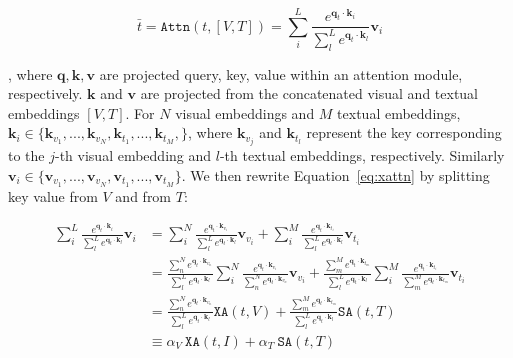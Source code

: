 
\begin{equation}
\bar{t} = \texttt{Attn}(t, [V, T]) = \sum_{i}^{L} \frac{e^{\bm{q}_t\cdot \bm{k}_{i}}}{\sum_{l}^{L} e^{\bm{q}_{t}\cdot \bm{k}_{l}}}\bm{v}_{i} \label{eq:xattn}
\end{equation}

, where $\bm{q}, \bm{k}, \bm{v}$ are projected query, key, value within an attention module, respectively.
$\bm{k}$ and $\bm{v}$ are projected from the concatenated visual and textual embeddings $[V, T]$.
For $N$ visual embeddings and $M$ textual embeddings, $\bm{k}_i \in \{\bm{k}_{v_1},...,\bm{k}_{v_N},\bm{k}_{t_1},...,\bm{k}_{t_M},\}$, where $\bm{k}_{v_j}$ and $\bm{k}_{t_l}$ represent the key corresponding to the $j$-th visual embedding and $l$-th textual embeddings, respectively. 
Similarly $\bm{v}_i \in \{\bm{v}_{v_1},...,\bm{v}_{v_N},\bm{v}_{t_1},...,\bm{v}_{t_M}\}$.
We then rewrite Equation~\ref{eq:xattn} by splitting key value from $V$ and from $T$:

\begin{align}
\sum_{i}^{L} \frac{e^{\bm{q}_t\cdot \bm{k}_{i}}}{\sum_{l}^{L} e^{\bm{q}_{t}\cdot \bm{k}_{l}}}\bm{v}_{i}
&= \sum_{i}^{N} \frac{e^{\bm{q}_t\cdot \bm{k}_{v_i}}}{\sum_{l}^{L} e^{\bm{q}_{t}\cdot \bm{k}_{l}}}\bm{v}_{v_i} +
\sum_{i}^{M} \frac{e^{\bm{q}_t\cdot \bm{k}_{t_i}}}{\sum_{l}^{L} e^{\bm{q}_{t}\cdot \bm{k}_{l}}}\bm{v}_{t_i}\\
&= \frac{\sum_{n}^{N} e^{\bm{q}_{t}\cdot \bm{k}_{v_n}}}{\sum_{l}^{L} e^{\bm{q}_{t}\cdot \bm{k}_{l}}} \sum_{i}^{N} \frac{e^{\bm{q}_t\cdot \bm{k}_{v_i}}}{\sum_{n}^{N} e^{\bm{q}_{t}\cdot \bm{k}_{v_n}}}\bm{v}_{v_i} +
\frac{\sum_{m}^{M} e^{\bm{q}_{t}\cdot \bm{k}_{t_m}}}{\sum_{l}^{L} e^{\bm{q}_{t}\cdot \bm{k}_{l}}} \sum_{i}^{M} \frac{e^{\bm{q}_t\cdot \bm{k}_{t_i}}}{\sum_{m}^{M} e^{\bm{q}_{t}\cdot \bm{k}_{t_m}}}\bm{v}_{t_i}\\
&= \frac{\sum_{n}^{N} e^{\bm{q}_{t}\cdot \bm{k}_{v_n}}}{\sum_{l}^{L} e^{\bm{q}_{t}\cdot \bm{k}_{l}}} \texttt{XA}(t,V) +
\frac{\sum_{m}^{M} e^{\bm{q}_{t}\cdot \bm{k}_{t_m}}}{\sum_{l}^{L} e^{\bm{q}_{t}\cdot \bm{k}_{l}}} \texttt{SA}(t,T)\\
&\equiv \alpha_V\ \texttt{XA}(t, I) + \alpha_T\ \texttt{SA}(t,T) \label{eq:dattn}
\end{align}

